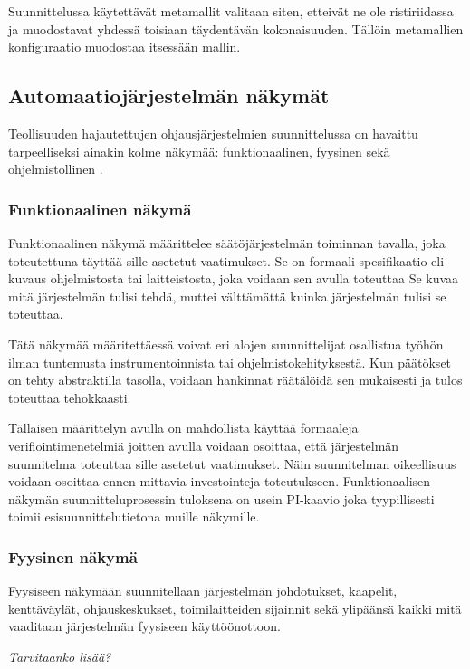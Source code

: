 \documentclass[finnish,12pt]{article}
\begin{document}
Suunnittelussa käytettävät metamallit valitaan siten, etteivät ne ole ristiriidassa ja muodostavat yhdessä toisiaan täydentävän kokonaisuuden.
Tällöin metamallien konfiguraatio muodostaa itsessään mallin.


	\subsection{Automaatiojärjestelmän näkymät}

Teollisuuden hajautettujen ohjausjärjestelmien suunnittelussa on havaittu
tarpeelliseksi ainakin kolme näkymää: funktionaalinen, fyysinen sekä ohjelmistollinen \cite{RefWorks:38}.


		\subsubsection{Funktionaalinen näkymä}

Funktionaalinen näkymä määrittelee säätöjärjestelmän toiminnan tavalla, joka toteutettuna täyttää sille asetetut vaatimukset.
Se on formaali spesifikaatio eli kuvaus ohjelmistosta tai laitteistosta, joka voidaan sen avulla toteuttaa
 Se kuvaa mitä järjestelmän tulisi tehdä, muttei välttämättä kuinka järjestelmän tulisi se toteuttaa.

Tätä näkymää määritettäessä voivat eri alojen suunnittelijat osallistua työhön ilman
tuntemusta instrumentoinnista tai ohjelmistokehityksestä. Kun päätökset on tehty
abstraktilla tasolla, voidaan hankinnat räätälöidä sen mukaisesti ja tulos
toteuttaa tehokkaasti.

Tällaisen määrittelyn avulla on mahdollista käyttää formaaleja verifiointimenetelmiä joitten avulla
voidaan osoittaa, että järjestelmän suunnitelma toteuttaa sille asetetut vaatimukset.
Näin suunnitelman oikeellisuus voidaan osoittaa ennen mittavia investointeja toteutukseen.
Funktionaalisen näkymän suunnitteluprosessin tuloksena on usein
PI-kaavio joka tyypillisesti toimii esisuunnittelutietona muille näkymille.


		\subsubsection{Fyysinen näkymä}

Fyysiseen näkymään suunnitellaan järjestelmän johdotukset, kaapelit, kenttäväylät,
ohjauskeskukset, toimilaitteiden sijainnit sekä ylipäänsä kaikki mitä vaaditaan 
järjestelmän fyysiseen käyttöönottoon.

\emph{Tarvitaanko lisää?}
\end{document}
